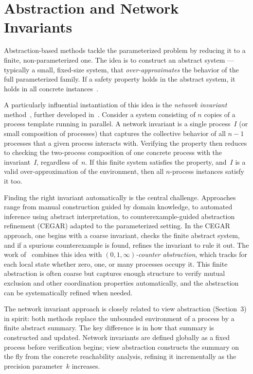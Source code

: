 \section{Abstraction and Network Invariants}

Abstraction-based methods tackle the parameterized problem by reducing it to a
finite, non-parameterized one. The idea is to construct an abstract system ---
typically a small, fixed-size system, that \emph{over-approximates} the
behavior of the full parameterized family. If a safety property holds in the
abstract system, it holds in all concrete instances~\cite{WL89,PXZ02}.

A particularly influential instantiation of this idea is the \emph{network
invariant} method~\cite{WL89}, further developed in~\cite{PXZ02}. Consider
a system consisting of $n$ copies of a process template running in parallel.
A network invariant is a single process~$I$ (or small composition of processes)
that captures the collective behavior of all $n-1$ processes that a given
process interacts with. Verifying the property then reduces to checking the
two-process composition of one concrete process with the invariant~$I$,
regardless of~$n$. If this finite system satisfies the property, and~$I$ is
a valid over-approximation of the environment, then all $n$-process instances
satisfy it too.

Finding the right invariant automatically is the central challenge. Approaches
range from manual construction guided by domain knowledge, to automated
inference using abstract interpretation, to counterexample-guided abstraction
refinement (CEGAR) adapted to the parameterized setting. In the CEGAR approach,
one begins with a coarse invariant, checks the finite abstract system, and if
a spurious counterexample is found, refines the invariant to rule it out. The
work of~\cite{PXZ02} combines this idea with \emph{$(0,1,\infty)$-counter
abstraction}, which tracks for each local state whether zero, one, or many
processes occupy it. This finite abstraction is often coarse but captures
enough structure to verify mutual exclusion and other coordination properties
automatically, and the abstraction can be systematically refined when needed.

The network invariant approach is closely related to view abstraction
(Section~3) in spirit: both methods replace the unbounded environment of a
process by a finite abstract summary. The key difference is in how that
summary is constructed and updated. Network invariants are defined globally
as a fixed process before verification begins; view abstraction constructs the
summary on the fly from the concrete reachability analysis, refining it
incrementally as the precision parameter~$k$ increases.
